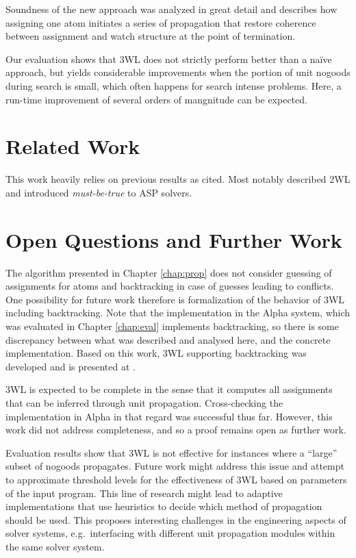 \documentclass[final]{vutinfth} %
\newcommand{\mbt}{must-be-true\xspace}
\begin{document}
Soundness of the new approach was analyzed in great detail and describes how assigning one atom initiates a series of propagation that restore coherence between assignment and watch structure at the point of termination.

Our evaluation shows that 3WL does not strictly perform better than a na\"{i}ve approach, but yields considerable improvements when the portion of unit nogoods during search is small, which often happens for search intense problems. Here, a run-time improvement of several orders of mangnitude can be expected.

\section{Related Work}

This work heavily relies on previous results as cited. Most notably \citet{effsat,questsat} described 2WL and \citet{dlv-mbt} introduced \emph{\mbt} to ASP solvers.

\section{Open Questions and Further Work}

The algorithm presented in Chapter \ref{chap:prop} does not consider guessing of assignments for atoms and backtracking in case of guesses leading to conflicts. One possibility for future work therefore is formalization of the behavior of 3WL including backtracking. Note that the implementation in the Alpha system, which was evaluated in Chapter \ref{chap:eval} implements backtracking, so there is some discrepancy between what was described and analysed here, and the concrete implementation. Based on this work, 3WL supporting backtracking was developed and is presented at \cite{alpha-techniques}.

3WL is expected to be complete in the sense that it computes all assignments that can be inferred through unit propagation. Cross-checking the implementation in Alpha in that regard was successful thus far. However, this work did not address completeness, and so a proof remains open as further work.

Evaluation results show that 3WL is not effective for instances where a \enquote{large} subset of nogoods propagates. Future work might address this issue and attempt to approximate threshold levels for the effectiveness of 3WL based on parameters of the input program. This line of research might lead to adaptive implementations that use heuristics to decide which method of propagation should be used. This proposes interesting challenges in the engineering aspects of solver systems, e.g.~interfacing with different unit propagation modules within the same solver system.
\end{document}
